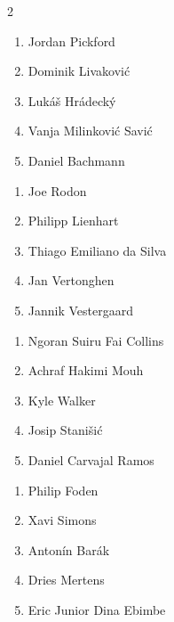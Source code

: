\documentclass[11pt]{article}
\begin{document}
\begin{multicols}{2}

\begin{samepage}
\begin{tcolorbox}[evalbox,title=\textbf{Manuel Neuer (Goalkeeper)} \hfill Score:\ \rule{1cm}{0.4pt}]
\begin{enumerate}
\item Jordan Pickford
\item Dominik Livaković
\item Lukáš Hrádecký
\item Vanja Milinković Savić
\item Daniel Bachmann
\end{enumerate}
\end{tcolorbox}
\end{samepage}

\begin{samepage}
\begin{tcolorbox}[evalbox,title=\textbf{Virgil van Dijk (Left Center Back)} \hfill Score:\ \rule{1cm}{0.4pt}]
\begin{enumerate}
\item Joe Rodon
\item Philipp Lienhart
\item Thiago Emiliano da Silva
\item Jan Vertonghen
\item Jannik Vestergaard
\end{enumerate}
\end{tcolorbox}
\end{samepage}

\begin{samepage}
\begin{tcolorbox}[evalbox,title=\textbf{Trent Alexander-Arnold (Right Defensive Midfield)} \hfill Score:\ \rule{1cm}{0.4pt}]
\begin{enumerate}
\item Ngoran Suiru Fai Collins
\item Achraf Hakimi Mouh
\item Kyle Walker
\item Josip Stanišić
\item Daniel Carvajal Ramos
\end{enumerate}
\end{tcolorbox}
\end{samepage}

\begin{samepage}
\begin{tcolorbox}[evalbox,title=\textbf{Kevin De Bruyne (Center Attacking Midfield)} \hfill Score:\ \rule{1cm}{0.4pt}]
\begin{enumerate}
\item Philip Foden
\item Xavi Simons
\item Antonín Barák
\item Dries Mertens
\item Eric Junior Dina Ebimbe
\end{enumerate}
\end{tcolorbox}
\end{samepage}


\end{multicols}
\end{document}
